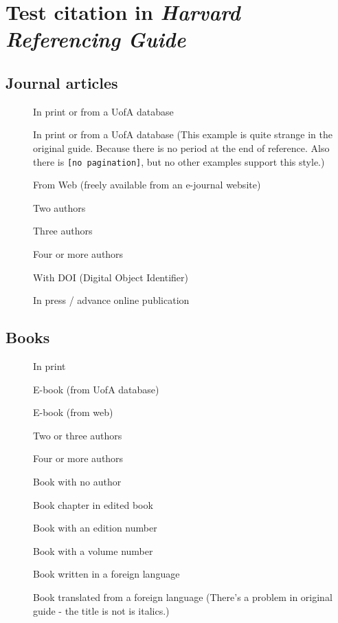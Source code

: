 \documentclass[a4paper]{article}
\begin{document}
\section{Test citation in \em{Harvard Referencing Guide}}

\subsection{Journal articles}

\begin{description}
    \item[\citep{habel2009academic}] In print or from a UofA database
    \item[\citep{waqas2022damage}] In print or from a UofA database (This example is quite strange in the original guide.
    Because there is no period at the end of reference. Also there is \texttt{[no pagination]}, but no other examples support this style.)
    \item[\citep{ticker2017music}] From Web (freely available from an e-journal website)
    \item[\citep{darwin2009mentoring}] Two authors
    \item[\citep{maier2007using}] Three authors
    \item[\citep{grosso2017coffee}] Four or more authors
    \item[\citep{lee2017relationship}] With DOI (Digital Object Identifier)
    \item[\citep{muldoon2013longitudinal}] In press / advance online publication
\end{description}

\subsection{Books}

\begin{description}
    \item[\citep{connell2009gender}] In print
    \item[\citep{white2020critical}] E-book (from UofA database)
    \item[\citep{teresa2015mass}] E-book (from web)
    \item[\citep{campbell2010students}] Two or three authors
    \item[\citep{henkin2006nuclear}] Four or more authors
    \item[\citep{2002style}] Book with no author
    \item[\citep{warner2010giving}] Book chapter in edited book
    \item[\citep{carroll2012business}] Book with an edition number
    \item[\citep{cowie1983oxford}] Book with a volume number
    \item[\citep{lemmens2010lagrammaire}] Book written in a foreign language
    \item[\citep{jansson1948finn}] Book translated from a foreign language (There's a problem in original guide - the title is not is italics.)
\end{description}
\end{document}
